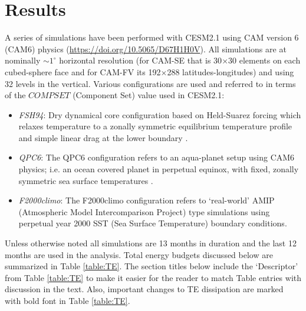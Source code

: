 \documentclass{agujournal}
\begin{document}
\section{Results}
\label{sec:results}
A series of simulations have been performed with CESM2.1 using CAM version 6 (CAM6) physics (\url{https://doi.org/10.5065/D67H1H0V}). All simulations are at nominally $\sim1^{\circ}$ horizontal resolution (for CAM-SE that is 30$\times$30 elements on each cubed-sphere face and for CAM-FV its 192$\times$288 latitudes-longitudes) and using 32 levels in the vertical. Various configurations are used and referred to in terms of the $COMPSET$ (Component Set) value used in CESM2.1: 
\begin{itemize}
\item {\em{FSH94}}: Dry dynamical core configuration based on Held-Suarez forcing which relaxes temperature to a zonally symmetric equilibrium temperature profile and simple linear drag at the lower boundary \citep{HS1994BAMS}. 
\item {\em{QPC6}}: The QPC6 configuration refers to an aqua-planet setup using CAM6 physics; i.e. an ocean covered planet in perpetual equinox, with fixed, zonally symmetric sea surface temperatures \citep{NH2000ASL,MWO2016JAMES}. 
\item {\em{F2000climo}}: The F2000climo configuration refers to `real-world' AMIP (Atmospheric Model Intercomparison Project) type simulations using perpetual year 2000 SST (Sea Surface Temperature) boundary conditions.
\end{itemize}
Unless otherwise noted all simulations are 13 months in duration and the last 12 months are used in the analysis. Total energy budgets discussed below are summarized in Table \ref{table:TE}. The section titles below include the `Descriptor' from Table \ref{table:TE} to make it easier for the reader to match Table entries with discussion in the text. Also, important changes to TE dissipation are marked with bold font in Table \ref{table:TE}.
\end{document}
